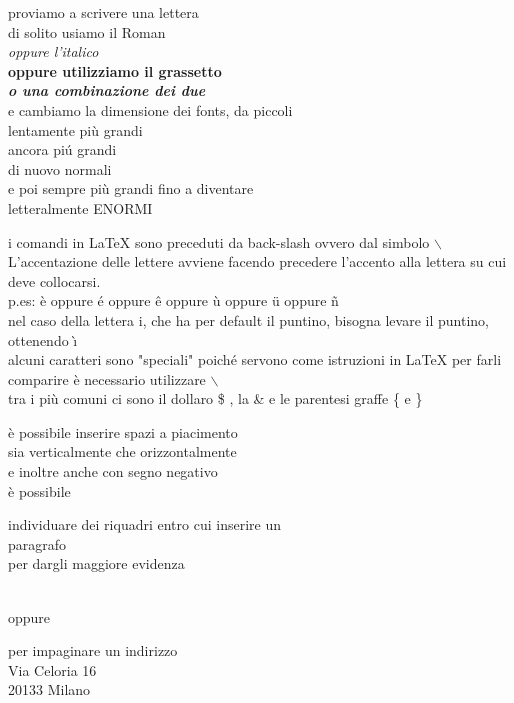 \documentclass[12pt]{letter}
\begin{document}
proviamo a scrivere una lettera\\
{\rm di solito usiamo il Roman}\\
{\it oppure l'italico }\\
{\bf oppure utilizziamo il grassetto}\\
{\bf\it o una combinazione dei due }\\
{\tiny e cambiamo la dimensione dei fonts, da piccoli}\\
{\scriptsize lentamente pi\`u grandi}\\
{\footnotesize ancora pi\'u grandi}\\
{\normalsize di nuovo normali}\\
{\large e poi sempre} {\Large pi\`u grandi} {\LARGE fino a diventare}\\
{\huge letteralmente} {\Huge ENORMI}\\

\clearpage

i comandi in LaTeX sono preceduti da back-slash ovvero dal simbolo 
$\backslash$\\
L'accentazione delle lettere avviene facendo precedere
l'accento alla lettera su cui deve collocarsi.\\
p.es: \`e oppure \'e oppure \^e oppure \`u oppure \"u 
oppure \~n\\
nel caso della lettera i, che ha per default il puntino, bisogna levare 
il puntino, ottenendo \`\i \\
alcuni caratteri sono "speciali" poich\'e servono come istruzioni in LaTeX
per farli comparire \`e necessario utilizzare $\backslash$\\
tra i pi\`u comuni ci sono il dollaro \$ , la \& e le parentesi 
graffe \{ e \}

\clearpage

\`e possibile inserire spazi a piacimento\\[2cm]
sia verticalmente che \hskip5cm orizzontalmente\\
e inoltre anche con segno negativo\\[1cm]
\`e possibile 
\parbox[t]{15cm}
{individuare dei riquadri entro cui inserire un\\
paragrafo\\
per dargli maggiore evidenza
}\\
oppure
\hskip8cm
\parbox[t]{5cm}
{per impaginare un indirizzo\\
Via Celoria 16\\
20133 Milano}
\end{document}
